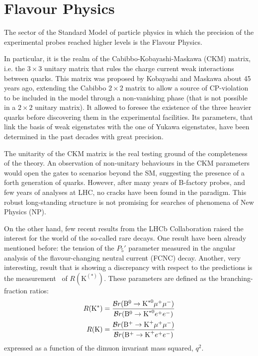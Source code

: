 \section{Flavour Physics}
\label{sec:flav}

The sector of the Standard Model of particle physics in which the precision of the experimental probes reached higher levels is the Flavour Physics.

In particular, it is the realm of the Cabibbo-Kobayashi-Maskawa (CKM) matrix, i.e. the $3\times3$ unitary matrix that rules the charge current weak interactions between quarks.
This matrix was proposed by Kobayashi and Maskawa about 45 years ago, extending the Cabibbo $2\times2$ matrix to allow a source of CP-violation to be included in the model through a non-vanishing phase (that is not possible in a $2\times2$ unitary matrix).
It allowed to foresee the existence of the three heavier quarks before discovering them in the experimental facilities.
Its parameters, that link the basis of weak eigenstates with the one of Yukawa eigenstates, have been determined in the past decades with great precision.

The unitarity of the CKM matrix is the real testing ground of the completeness of the theory.
An observation of non-unitary behaviours in the CKM parameters would open the gates to scenarios beyond the SM, suggesting the presence of a forth generation of quarks.
However, after many years of B-factory probes, and few years of analyses at LHC, no cracks have been found in the paradigm.
This robust long-standing structure is not promising for searches of phenomena of New Physics (NP).

On the other hand, few recent results from the LHCb Collaboration raised the interest for the world of the so-called rare decays.
One result have been already mentioned before: the tension of the $P_5'$ parameter measured in the angular analysis of the flavour-changing neutral current (FCNC) \BtoKstmumu decay.
Another, very interesting, result that is showing a discrepancy with respect to the predictions is the measurement~\cite{Aaij:2017vbb} of $R(\mathrm{K}^{(*)})$.
These parameters are defined as the branching-fraction ratios:
\begin{equation}\label{eq:RK-def}
  \begin{split}
    R(\mathrm{K}^{*}) &= \frac{\mathcal{B}r({\textrm{B}}{}^{0}\to\textrm{K}^{*0}\mu^+\mu^-)}{\mathcal{B}r({\textrm{B}}{}^{0}\to\textrm{K}^{*0} e^+e^-)} \\
    R(\mathrm{K})     &= \frac{\mathcal{B}r({\textrm{B}}{}^{+}\to\textrm{K}^{+}\mu^+\mu^-)}{\mathcal{B}r({\textrm{B}}{}^{+}\to\textrm{K}^{+} e^+e^-)}
  \end{split}
\end{equation}
expressed as a function of the dimuon invariant mass squared, $q^2$.

